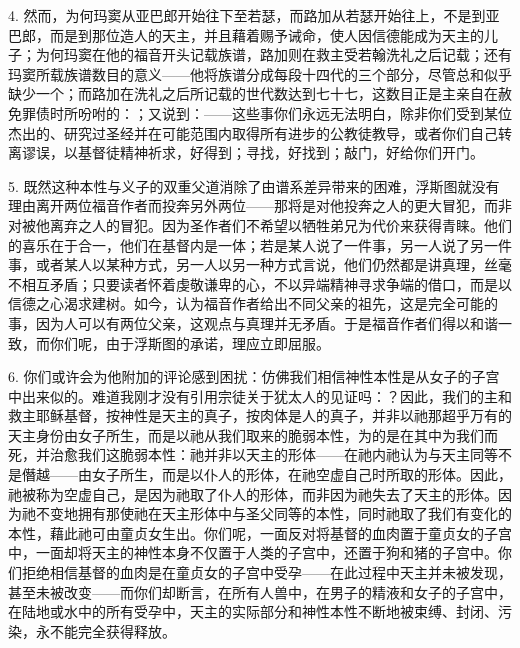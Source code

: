4. 然而，为何玛窦从亚巴郎开始往下至若瑟，而路加从若瑟开始往上，不是到亚巴郎，而是到那位造人的天主，并且藉着赐予诫命，使人因信德能成为天主的儿子；为何玛窦在他的福音开头记载族谱，路加则在救主受若翰洗礼之后记载；还有玛窦所载族谱数目的意义——他将族谱分成每段十四代的三个部分，尽管总和似乎缺少一个；而路加在洗礼之后所记载的世代数达到七十七，这数目正是主亲自在赦免罪债时所吩咐的：；又说到：——这些事你们永远无法明白，除非你们受到某位杰出的、研究过圣经并在可能范围内取得所有进步的公教徒教导，或者你们自己转离谬误，以基督徒精神祈求，好得到；寻找，好找到；敲门，好给你们开门。\par

5. 既然这种本性与义子的双重父道消除了由谱系差异带来的困难，浮斯图就没有理由离开两位福音作者而投奔另外两位——那将是对他投奔之人的更大冒犯，而非对被他离弃之人的冒犯。因为圣作者们不希望以牺牲弟兄为代价来获得青睐。他们的喜乐在于合一，他们在基督内是一体；若是某人说了一件事，另一人说了另一件事，或者某人以某种方式，另一人以另一种方式言说，他们仍然都是讲真理，丝毫不相互矛盾；只要读者怀着虔敬谦卑的心，不以异端精神寻求争端的借口，而是以信德之心渴求建树。如今，认为福音作者给出不同父亲的祖先，这是完全可能的事，因为人可以有两位父亲，这观点与真理并无矛盾。于是福音作者们得以和谐一致，而你们呢，由于浮斯图的承诺，理应立即屈服。\par

6. 你们或许会为他附加的评论感到困扰：仿佛我们相信神性本性是从女子的子宫中出来似的。难道我刚才没有引用宗徒关于犹太人的见证吗：？因此，我们的主和救主耶稣基督，按神性是天主的真子，按肉体是人的真子，并非以祂那超乎万有的天主身份由女子所生，而是以祂从我们取来的脆弱本性，为的是在其中为我们而死，并治愈我们这脆弱本性：祂并非以天主的形体——在祂内祂认为与天主同等不是僭越——由女子所生，而是以仆人的形体，在祂空虚自己时所取的形体。因此，祂被称为空虚自己，是因为祂取了仆人的形体，而非因为祂失去了天主的形体。因为祂不变地拥有那使祂在天主形体中与圣父同等的本性，同时祂取了我们有变化的本性，藉此祂可由童贞女生出。你们呢，一面反对将基督的血肉置于童贞女的子宫中，一面却将天主的神性本身不仅置于人类的子宫中，还置于狗和猪的子宫中。你们拒绝相信基督的血肉是在童贞女的子宫中受孕——在此过程中天主并未被发现，甚至未被改变——而你们却断言，在所有人兽中，在男子的精液和女子的子宫中，在陆地或水中的所有受孕中，天主的实际部分和神性本性不断地被束缚、封闭、污染，永不能完全获得释放。\par

